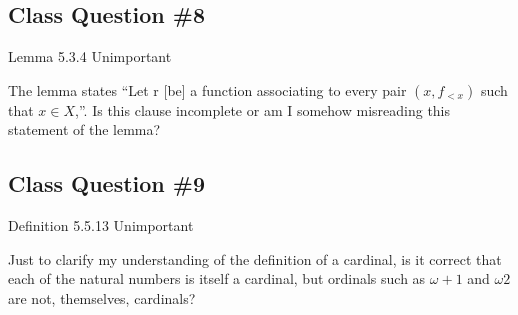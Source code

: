 \documentclass[12pt]{article}
\begin{document}
\subsection{Class Question \#8}

Lemma 5.3.4
Unimportant

The lemma states ``Let r [be] a function associating to every pair $(x, f_{<x})$ such that $x \in X$,''.  Is this clause incomplete or am I somehow misreading this statement of the lemma?

\subsection{Class Question \#9}

Definition 5.5.13
Unimportant

Just to clarify my understanding of the definition of a cardinal, is it correct that each of the natural numbers is itself a cardinal, but ordinals such as $\omega + 1$ and $\omega 2$ are not, themselves, cardinals?
\end{document}
